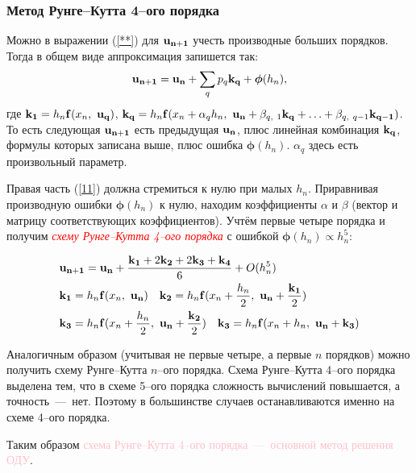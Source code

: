 \documentclass[a4,14pt,russian]{article}
\begin{document}
\subsubsection{Метод Рунге--Кутта 4--ого порядка}
    Можно в выражении (\ref{**}) для ${\bf u_{n+1}}$ учесть производные больших порядков. Тогда в общем виде аппроксимация запишется так:
    \begin{equation}\label{11}
        {\bf u_{n+1}} = {\bf u_{n}} + \sum_q p_q {\bf k_q} + \boldsymbol{\phi} (h_n), 
    \end{equation}
    где ${\bf k_1}=h_n{\bf f}(x_n,\ {\bf u_q})$, ${\bf k_q}=h_n {\bf f}(x_n + \alpha_q h_n,\ {\bf u_{n}} + \beta_{q,\ 1} {\bf k_q} + \ldots + \beta_{q,\ q-1} {\bf k_{q-1}} )$. То есть следующая ${\bf u_{n+1}}$ есть предыдущая ${\bf u_{n}}$, плюс линейная комбинация ${\bf k_{q}}$, формулы которых записана выше, плюс ошибка $\boldsymbol{\phi} (h_n)$. $\alpha_q$ здесь есть произвольный параметр.\par
    Правая часть (\ref{11}) должна стремиться к нулю при малых $h_n$. Приравнивая производную ошибки $\boldsymbol{\phi} (h_n)$ к нулю, находим коэффициенты $\alpha$ и $\beta$ (вектор и матрицу соответствующих коэффициентов). Учтём первые четыре порядка и получим \textcolor{red}{\it схему Рунге--Кутта 4--ого порядка} с ошибкой $\boldsymbol{\phi} (h_n) \propto h_n^5$:
    
    \begin{equation}\label{Runge-Kutta 4th}
        \begin{split}
        &{\bf u_{n+1}} = {\bf u_{n}} + \frac{{\bf k_1} +2{\bf k_2} + 2{\bf k_3}+{\bf k_4}}{6}+O(h_n^5) \\
        &{\bf k_1}=h_n{\bf f}(x_n,\ {\bf u_n}) \quad
        {\bf k_2}=h_n{\bf f}(x_n + \frac{h_n}2,\ {\bf u_n} + \frac{\bf k_1}{2})\\
        &{\bf k_3}=h_n{\bf f}(x_n + \frac{h_n}2,\ {\bf u_n} + \frac{\bf k_2}{2})\quad
        {\bf k_3}=h_n{\bf f}(x_n + h_n,\ {\bf u_n} + {\bf k_3})
        \end{split}
    \end{equation}
    
    Аналогичным образом (учитывая не первые четыре, а первые $n$ порядков) можно получить схему Рунге--Кутта $n$--ого порядка. Схема Рунге--Кутта 4--ого порядка выделена тем, что в схеме 5--ого порядка сложность вычислений повышается, а точность~---~нет. Поэтому в большинстве случаев останавливаются именно на схеме 4--ого порядка.\par
    Таким образом \textcolor{pink}{схема Рунге--Кутта 4--ого порядка~---~основной метод решения ОДУ}.
\end{document}
